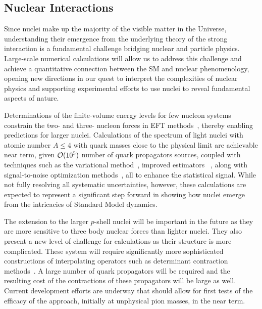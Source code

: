 \subsection{Nuclear Interactions}

Since nuclei make up the majority of the visible matter in the Universe, understanding their emergence from the underlying theory of the strong interaction is a fundamental challenge bridging nuclear and particle physics. Large-scale numerical calculations will allow us to address this challenge and achieve a quantitative connection between the SM and nuclear phenomenology, opening new directions in our quest to interpret the complexities of nuclear physics and supporting experimental efforts to use nuclei to reveal fundamental aspects of nature.

Determinations of the finite-volume energy levels for few nucleon systems constrain the two- and three- nucleon forces in EFT methods~\cite{Barnea:2013uqa}, thereby enabling predictions for larger nuclei. Calculations of the spectrum of light nuclei with atomic number $A\le 4$ with quark masses close to the physical limit are achievable near term, given ${\cal O}(10^5)$ number of quark propagators sources, coupled with techniques such as the variational method~\cite{Michael:1985ne}, improved estimators~ \cite{Beane:2014oea}, along with signal-to-noise optimization methods~\cite{Detmold:2014hla}, all to enhance the statistical signal. While not fully resolving all systematic uncertainties, however, these calculations are expected to represent a significant step forward in showing how nuclei emerge from the intricacies of Standard Model dynamics.

The extension to the larger $p$-shell nuclei will be important in the future as they are more sensitive to three body nuclear forces than lighter nuclei. They also present a new level of challenge for calculations as their structure is more complicated. These system will require significantly more sophisticated constructions of interpolating operators such as determinant contraction methods~\cite{Detmold:2012eu,Vachaspati:2014bda}. A large number of quark propagators will be required and the resulting cost of the contractions of these propagators will be large as well. Current development efforts are underway that should allow for first tests of the efficacy of the approach, initially at unphysical pion masses, in the near term.


